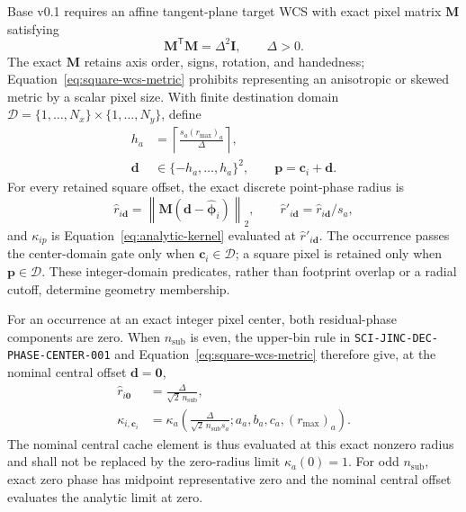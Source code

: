 Base v0.1 requires an affine tangent-plane target WCS with exact pixel matrix
$\mathbf{M}$ satisfying
\begin{equation}
  \mathbf{M}^{\mathsf T}\mathbf{M}=\Delta^2\mathbf{I},
  \qquad \Delta>0.
  \label{eq:square-wcs-metric}
\end{equation}
The exact $\mathbf{M}$ retains axis order, signs, rotation, and handedness;
Equation~\eqref{eq:square-wcs-metric} prohibits representing an anisotropic or
skewed metric by a scalar pixel size.  With finite destination domain
$\mathcal{D}=\{1,\ldots,N_x\}\mathbin{\times}\{1,\ldots,N_y\}$, define
\begin{align}
  h_a &=\left\lceil\frac{s_a(r_{\max})_a}{\Delta}\right\rceil,
       \label{eq:cache-half-width}\\
  \boldsymbol{d}&\in\{-h_a,\ldots,h_a\}^2,
       \qquad \boldsymbol{p}=\boldsymbol{c}_i+\boldsymbol{d}.
       \label{eq:square-offsets}
\end{align}
For every retained square offset, the exact discrete point-phase radius is
\begin{equation}
  \widehat r_{i\boldsymbol{d}}
   =\left\|\mathbf{M}
      (\boldsymbol{d}-\widehat{\boldsymbol{\phi}}_i)\right\|_2,
  \qquad
  \widehat r'_{i\boldsymbol{d}}=
      \widehat r_{i\boldsymbol{d}}/s_a,
  \label{eq:discrete-radius}
\end{equation}
and $\kappa_{ip}$ is Equation~\eqref{eq:analytic-kernel} evaluated at
$\widehat r'_{i\boldsymbol{d}}$.  The occurrence passes the center-domain gate
only when $\boldsymbol{c}_i\in\mathcal{D}$; a square pixel is retained only
when $\boldsymbol{p}\in\mathcal{D}$.  These integer-domain predicates, rather
than footprint overlap or a radial cutoff, determine geometry membership.

For an occurrence at an exact integer pixel center, both residual-phase
components are zero.  When $n_{\mathrm{sub}}$ is even, the upper-bin rule in
\texttt{SCI-JINC-DEC-PHASE-CENTER-001} and
Equation~\eqref{eq:square-wcs-metric} therefore give, at
the nominal central offset $\boldsymbol d=\boldsymbol0$,
\begin{align*}
  \widehat r_{i\boldsymbol0}
    &=\frac{\Delta}{\sqrt{2}\,n_{\mathrm{sub}}},\\
  \kappa_{i,\boldsymbol c_i}
    &=\kappa_a\!\left(
       \frac{\Delta}{\sqrt{2}\,n_{\mathrm{sub}}s_a};
       a_a,b_a,c_a,(r_{\max})_a\right).
\end{align*}
The nominal central cache element is thus evaluated at this exact nonzero
radius and shall not be replaced by the zero-radius limit
$\kappa_a(0)=1$.  For odd $n_{\mathrm{sub}}$, exact zero phase has midpoint
representative zero and the nominal central offset evaluates the analytic
limit at zero.

